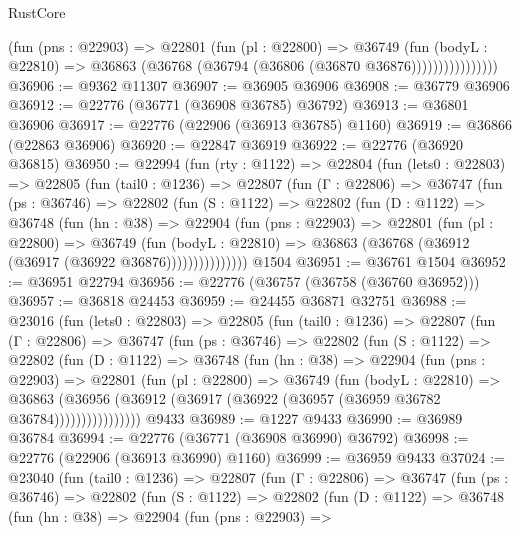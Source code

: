 \begin{lexlean}{RustCore}
\begin{coremodule}
                      (fun (pns : @22903) =>
                      @22801
                        (fun (pl : @22800) =>
                        @36749
                          (fun (bodyL : @22810) =>
                          @36863 (@36768 (@36794 (@36806 (@36870 @36876))))))))))))))))
@36906 := @9362 @11307
@36907 := @36905 @36906
@36908 := @36779 @36906
@36912 := @22776 (@36771 (@36908 @36785) @36792)
@36913 := @36801 @36906
@36917 := @22776 (@22906 (@36913 @36785) @1160)
@36919 := @36866 (@22863 @36906)
@36920 := @22847 @36919
@36922 := @22776 (@36920 @36815)
@36950 := @22994
    (fun (rty : @1122) =>
    @22804
      (fun (lets0 : @22803) =>
      @22805
        (fun (tail0 : @1236) =>
        @22807
          (fun (Γ : @22806) =>
          @36747
            (fun (ps : @36746) =>
            @22802
              (fun (S : @1122) =>
              @22802
                (fun (D : @1122) =>
                @36748
                  (fun (hn : @38) =>
                  @22904
                    (fun (pns : @22903) =>
                    @22801
                      (fun (pl : @22800) =>
                      @36749
                        (fun (bodyL : @22810) =>
                        @36863 (@36768 (@36912 (@36917 (@36922 @36876)))))))))))))))
    @1504
@36951 := @36761 @1504
@36952 := @36951 @22794
@36956 := @22776 (@36757 (@36758 (@36760 @36952)))
@36957 := @36818 @24453
@36959 := @24455 @36871 @32751
@36988 := @23016
    (fun (lets0 : @22803) =>
    @22805
      (fun (tail0 : @1236) =>
      @22807
        (fun (Γ : @22806) =>
        @36747
          (fun (ps : @36746) =>
          @22802
            (fun (S : @1122) =>
            @22802
              (fun (D : @1122) =>
              @36748
                (fun (hn : @38) =>
                @22904
                  (fun (pns : @22903) =>
                  @22801
                    (fun (pl : @22800) =>
                    @36749
                      (fun (bodyL : @22810) =>
                      @36863
                        (@36956
                          (@36912 (@36917 (@36922 (@36957 (@36959 @36782 @36784))))))))))))))))
    @9433
@36989 := @1227 @9433
@36990 := @36989 @36784
@36994 := @22776 (@36771 (@36908 @36990) @36792)
@36998 := @22776 (@22906 (@36913 @36990) @1160)
@36999 := @36959 @9433
@37024 := @23040
    (fun (tail0 : @1236) =>
    @22807
      (fun (Γ : @22806) =>
      @36747
        (fun (ps : @36746) =>
        @22802
          (fun (S : @1122) =>
          @22802
            (fun (D : @1122) =>
            @36748
              (fun (hn : @38) =>
              @22904
                (fun (pns : @22903) =>

\end{coremodule}
\end{lexlean}
